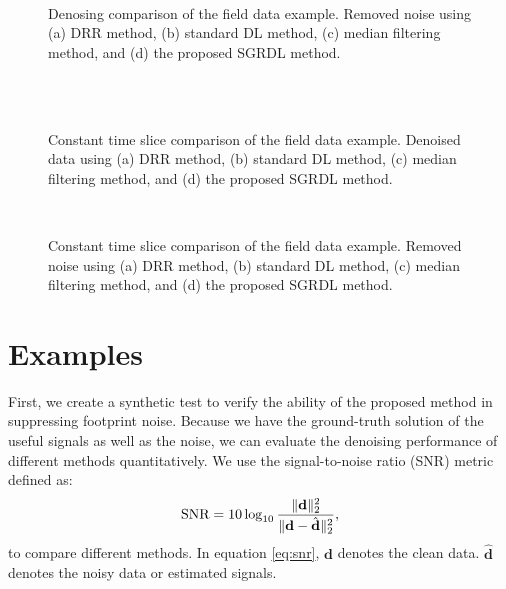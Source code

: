 \begin{figure}[htb!]
\centering
{}
\\
\caption{Denosing comparison of the field data example. Removed noise using (a) DRR method, (b) standard DL method, (c) median filtering method, and (d) the proposed SGRDL method. }
\label{fig:p-drr-n-0,p-dl-n,p-mf-n-0,p-sgrdl-n}
\end{figure}



\begin{figure}[htb!]
\centering
{}\\
\\
\caption{Constant time slice comparison of the field data example. Denoised data using (a) DRR method, (b) standard DL method, (c) median filtering method, and (d) the proposed SGRDL method. }
\label{fig:p-drr-t,p-dl-t,p-mf-t,p-sgrdl-t}
\end{figure}


\begin{figure}[htb!]
\centering
{}
\\
\caption{Constant time slice comparison of the field data example. Removed noise using (a) DRR method, (b) standard DL method, (c) median filtering method, and (d) the proposed SGRDL method. }
\label{fig:p-drr-n-t,p-dl-n-t,p-mf-n-t,p-sgrdl-n-t}
\end{figure}


\section{Examples}
First, we create a synthetic test to verify the ability of the proposed method in suppressing footprint noise. Because we have the ground-truth solution of the useful signals as well as the noise, we can evaluate the denoising performance of different methods quantitatively. We use the signal-to-noise ratio (SNR) metric defined as:
\begin{equation}
\label{eq:snr}
\text{SNR}=10\log_{10}\frac{\Arrowvert \mathbf{d} \Arrowvert_2^2}{\Arrowvert \mathbf{d} -\hat{\mathbf{d}}\Arrowvert_2^2},
\end{equation}
to compare different methods. In equation \ref{eq:snr}, $\mathbf{d}$ denotes the clean data. $\hat{\mathbf{d}}$ denotes the noisy data or estimated signals.

